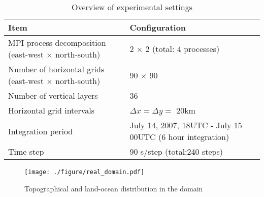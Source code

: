 \begin{table}[tb]
\begin{center}
  \caption{Overview of experimental settings}
  \label{tab:grids}
  \begin{tabularx}{150mm}{|l|X|} \hline
    \rowcolor[gray]{0.9} Item & Configuration \\ \hline
    MPI process decomposition (east-west $\times$ north-south) & 2 $\times$ 2 (total: 4 processes) \\ \hline
    Number of horizontal grids (east-west $\times$ north-south) & 90 $\times$ 90  \\ \hline
    Number of vertical layers   & 36                   \\ \hline
    Horizontal grid intervals   & $\Delta x  = \Delta y = $ 20km       \\ \hline
    Integration period & July 14, 2007, 18UTC - July 15 00UTC (6 hour integration) \\ \hline
    Time step & 90 s/step (total:240 steps) \\ \hline
  \end{tabularx}
\end{center}
\end{table}

\begin{figure}[tb]
\begin{center}
  \texttt{[image: ./figure/real\_domain.pdf]}\\
  \caption{Topographical and land-ocean distribution in the domain}
  \label{fig:tutrial_real_domain}
\end{center}
\end{figure}


